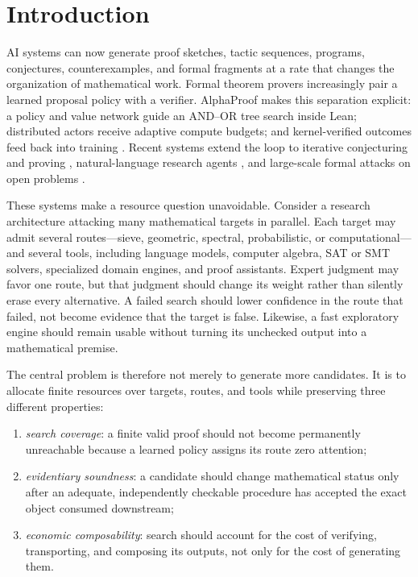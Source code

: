 \documentclass[11pt]{article}
\begin{document}
\section{Introduction}

AI systems can now generate proof sketches, tactic sequences, programs,
conjectures, counterexamples, and formal fragments at a rate that changes the
organization of mathematical work.  Formal theorem provers increasingly pair
a learned proposal policy with a verifier.  AlphaProof makes this separation
explicit: a policy and value network guide an AND--OR tree search inside Lean;
distributed actors receive adaptive compute budgets; and kernel-verified
outcomes feed back into training
\citep{hubert2025alphaproof}.  Recent systems extend the loop to iterative
conjecturing and proving \citep{dong2025stp}, natural-language research agents
\citep{feng2026aletheia}, and large-scale formal attacks on open problems
\citep{tsoukalas2026formalresearch}.

These systems make a resource question unavoidable.  Consider a research
architecture attacking many mathematical targets in parallel.  Each target
may admit several routes---sieve, geometric, spectral, probabilistic, or
computational---and several tools, including language models, computer
algebra, SAT or SMT solvers, specialized domain engines, and proof assistants.
Expert judgment may favor one route, but that judgment should change its
weight rather than silently erase every alternative.  A failed search should
lower confidence in the route that failed, not become evidence that the target
is false.  Likewise, a fast exploratory engine should remain usable without
turning its unchecked output into a mathematical premise.

The central problem is therefore not merely to generate more candidates.  It
is to allocate finite resources over targets, routes, and tools while
preserving three different properties:

\begin{enumerate}[leftmargin=*,itemsep=2pt]
  \item \emph{search coverage}: a finite valid proof should not become
        permanently unreachable because a learned policy assigns its route
        zero attention;
  \item \emph{evidentiary soundness}: a candidate should change mathematical
        status only after an adequate, independently checkable procedure has
        accepted the exact object consumed downstream;
  \item \emph{economic composability}: search should account for the cost of
        verifying, transporting, and composing its outputs, not only for the
        cost of generating them.
\end{enumerate}
\end{document}
